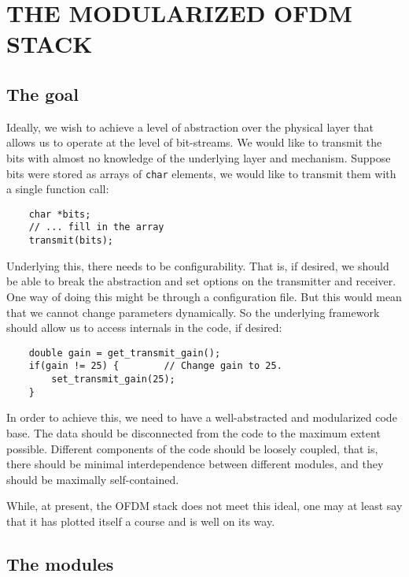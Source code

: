 \chapter{THE MODULARIZED OFDM STACK}
\label{chap:ofdm-stack}


\section{The goal}

Ideally, we wish to achieve a level of abstraction over the physical layer that
allows us to operate at the level of bit-streams. We would like to transmit the
bits with almost no knowledge of the underlying layer and mechanism. Suppose
bits were stored as arrays of \lstinline!char! elements, we would like to
transmit them with a single function call:

\begin{lstlisting}
	char *bits;
	// ... fill in the array
	transmit(bits);
\end{lstlisting}

Underlying this, there needs to be configurability. That is, if desired, we
should be able to break the abstraction and set options on the transmitter and
receiver. One way of doing this might be through a configuration file. But this
would mean that we cannot change parameters dynamically. So the underlying
framework should allow us to access internals in the code, if desired:

\begin{lstlisting}
	double gain = get_transmit_gain();
	if(gain != 25) {        // Change gain to 25.
		set_transmit_gain(25);
	}
\end{lstlisting}

In order to achieve this, we need to have a well-abstracted and modularized
code base. The data should be disconnected from the code to the maximum extent
possible. Different components of the code should be loosely coupled, that is,
there should be minimal interdependence between different modules, and they
should be maximally self-contained.

While, at present, the OFDM stack does not meet this ideal, one may at least
say that it has plotted itself a course and is well on its way.


\section{The modules}


